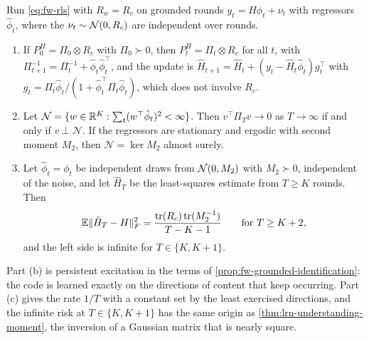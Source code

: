 \begin{proposition}\label{prop:lrn-code-risk}
Run \cref{eq:fw-rls} with $R_w=R_c$ on grounded rounds $y_t=H\phi_t+\nu_t$ with regressors $\hat\phi_t$, where the $\nu_t\sim\mathcal{N}(0,R_c)$ are independent over rounds.
\begin{enumerate}
\item[(a)] If $P^H_0=\Pi_0\otimes R_c$ with $\Pi_0\succ0$, then $P^H_t=\Pi_t\otimes R_c$ for all $t$, with $\Pi_{t+1}^{-1}=\Pi_t^{-1}+\hat\phi_t\hat\phi_t^\top$, and the update is $\hat H_{t+1}=\hat H_t+(y_t-\hat H_t\hat\phi_t)g_t^\top$ with $g_t=\Pi_t\hat\phi_t/(1+\hat\phi_t^\top\Pi_t\hat\phi_t)$, which does not involve $R_c$.
\item[(b)] Let $\mathcal N=\{w\in\mathbb{R}^K:\sum_t(w^\top\hat\phi_t)^2<\infty\}$. Then $v^\top\Pi_Tv\to0$ as $T\to\infty$ if and only if $v\perp\mathcal N$. If the regressors are stationary and ergodic with second moment $M_2$, then $\mathcal N=\ker M_2$ almost surely.
\item[(c)] Let $\hat\phi_t=\phi_t$ be independent draws from $\mathcal{N}(0,M_2)$ with $M_2\succ0$, independent of the noise, and let $\hat H_T$ be the least-squares estimate from $T\ge K$ rounds. Then
\begin{equation}\label{eq:lrn-code-risk}
\mathbb{E}\Vert\hat H_T-H\Vert_F^2=\frac{\operatorname{tr}(R_c)\operatorname{tr}(M_2^{-1})}{T-K-1}\qquad\text{for }T\ge K+2,
\end{equation}
and the left side is infinite for $T\in\{K,K+1\}$.
\end{enumerate}
\end{proposition}

Part (b) is persistent excitation in the terms of \cref{prop:fw-grounded-identification}: the code is learned exactly on the directions of content that keep occurring. Part (c) gives the rate $1/T$ with a constant set by the least exercised directions, and the infinite risk at $T\in\{K,K+1\}$ has the same origin as \cref{thm:lrn-understanding-moment}, the inversion of a Gaussian matrix that is nearly square.


